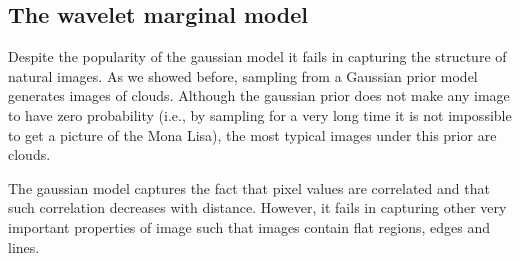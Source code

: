%
%
%
%
%
%
%
%
%
%
%
%
%
%
\subsection{The wavelet marginal model}

Despite the popularity of the gaussian model it fails in capturing the structure of natural images. As we showed before, sampling from a Gaussian prior model generates images of clouds. Although the gaussian prior does not make any image to have zero probability (i.e., by sampling for a very long time it is not impossible to get a picture of the Mona Lisa), the most typical images under this prior are clouds.

The gaussian model captures the fact that pixel values are correlated and that such correlation decreases with distance. However, it fails in capturing other very important properties of image such that images contain flat regions, edges and lines.

